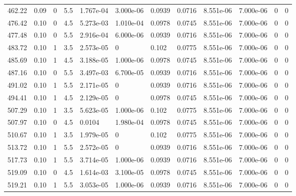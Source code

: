 \documentclass[preview]{standalone}
\begin{document}
{{{\begin{tabular}{L{1.2cm}C{1.2cm} C{0.3cm}C{0.5cm} C{1.4cm}C{1.4cm} C{1.4cm}C{1.4cm} C{1.6cm}C{1.6cm} C{1.6cm}C{1.6cm}}
  462.22  &  0.09  & 0     & 5.5 &  1.767e-04  & 3.000e-06  &  0.0939&   0.0716& 8.551e-06 & 7.000e-06   &  0 & 0  \\ 
  476.42  &  0.10  & 0     & 4.5 &  5.273e-03  & 1.010e-04  &  0.0978&   0.0745& 8.551e-06 & 7.000e-06   &  0 & 0  \\ 
  477.48  &  0.10  & 0     & 5.5 &  2.916e-04  & 6.000e-06  &  0.0939&   0.0716& 8.551e-06 & 7.000e-06   &  0 & 0  \\ 
  483.72  &  0.10  & 1     & 3.5 &  2.573e-05  & 0  &  0.102&   0.0775& 8.551e-06 & 7.000e-06   &  0 & 0  \\ 
  485.69  &  0.10  & 1     & 4.5 &  3.188e-05  & 1.000e-06  &  0.0978&   0.0745& 8.551e-06 & 7.000e-06   &  0 & 0  \\ 
  487.16  &  0.10  & 0     & 5.5 &  3.497e-03  & 6.700e-05  &  0.0939&   0.0716& 8.551e-06 & 7.000e-06   &  0 & 0  \\ 
  491.02  &  0.10  & 1     & 5.5 &  2.171e-05  & 0  &  0.0939&   0.0716& 8.551e-06 & 7.000e-06   &  0 & 0  \\ 
  494.41  &  0.10  & 1     & 4.5 &  2.129e-05  & 0  &  0.0978&   0.0745& 8.551e-06 & 7.000e-06   &  0 & 0  \\ 
  507.29  &  0.10  & 1     & 3.5 &  5.623e-05  & 1.000e-06  &  0.102&   0.0775& 8.551e-06 & 7.000e-06   &  0 & 0  \\ 
  507.97  &  0.10  & 0     & 4.5 &  0.0104  & 1.980e-04  &  0.0978&   0.0745& 8.551e-06 & 7.000e-06   &  0 & 0  \\ 
  510.67  &  0.10  & 1     & 3.5 &  1.979e-05  & 0  &  0.102&   0.0775& 8.551e-06 & 7.000e-06   &  0 & 0  \\ 
  513.72  &  0.10  & 1     & 5.5 &  2.572e-05  & 0  &  0.0939&   0.0716& 8.551e-06 & 7.000e-06   &  0 & 0  \\ 
  517.73  &  0.10  & 1     & 5.5 &  3.714e-05  & 1.000e-06  &  0.0939&   0.0716& 8.551e-06 & 7.000e-06   &  0 & 0  \\ 
  519.09  &  0.10  & 0     & 4.5 &  1.614e-03  & 3.100e-05  &  0.0978&   0.0745& 8.551e-06 & 7.000e-06   &  0 & 0  \\ 
  519.21  &  0.10  & 1     & 5.5 &  3.053e-05  & 1.000e-06  &  0.0939&   0.0716& 8.551e-06 & 7.000e-06   &  0 & 0  \\ 
\hline 
\end{tabular} 

}}}
\end{document}
